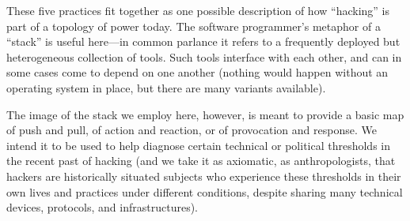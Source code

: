\documentclass[10pt,letter,oneside]{scrartcl}
\begin{document}
These five practices fit together as one possible description of how ``hacking''
is part of a topology of power today.  The software programmer's metaphor
of a ``stack'' is useful here---in common parlance it refers to a frequently
deployed but heterogeneous collection of tools.  Such tools interface with each
other, and can in some cases come to depend on one another (nothing would happen
without an operating system in place, but there are many variants available).

The image of the stack we employ here, however, is meant to provide a basic map
of push and pull, of action and reaction, or of provocation and response.  We
intend it to be used to help diagnose certain technical or political thresholds
in the recent past of hacking (and we take it as axiomatic, as anthropologists, that
hackers are historically situated subjects who experience these thresholds in
their own lives and practices under different conditions, despite sharing many
technical devices, protocols, and infrastructures).   

%
%
\end{document}
